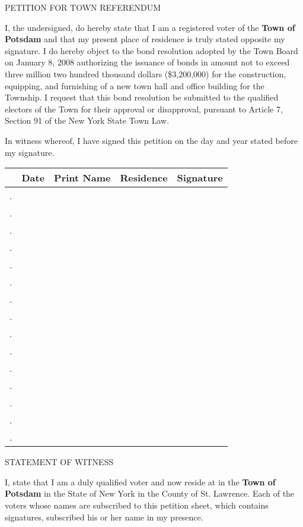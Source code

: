 \documentclass[12pt]{article}
\begin{document}
\begin{center}
PETITION FOR TOWN REFERENDUM
\end{center}

I, the undersigned, do hereby state that I am a  registered  voter  of
 the  {\bf Town  of Potsdam} and that  my present  place of residence is truly
  stated opposite my signature.  I do hereby object to the bond resolution adopted by the Town Board on January 8, 2008 authorizing the issuance of bonds in amount not to exceed three million two hundred thousand dollars (\$3,200,000) for the construction, equipping, and furnishing of a new town hall and office building for the Township.  I request that this bond resolution be submitted to the qualified electors of the Town for their approval or disapproval, pursuant to Article 7, Section 91 of the New York State Town Law.

In witness whereof, I have signed this petition on the  day  and  year
  stated before my signature.

\vspace{0.25in}

{\Large

\setcounter{sigNumber}{1}

\newcommand\sigLine{\thesigNumber. \addtocounter{sigNumber}{1} & & & &\\
\hline}

\begin{center}
\noindent\begin{tabular}{|r|p{}|p{}|p{}|p{}|}
\hline
&Date&Print Name&Residence&Signature\\
\hline
\hline
\sigLine
\sigLine
\sigLine
\sigLine
\sigLine
\sigLine
\sigLine
\sigLine
\sigLine
\sigLine
\sigLine
\sigLine
\sigLine
\sigLine
\sigLine
\end{tabular}
\end{center}

}

\vspace{0.25in}

\begin{center}
STATEMENT OF WITNESS
\end{center}

    I,  \underline{\hspace{4in}}  state  that I am a duly qualified voter and
  now reside at  \underline{\hspace{4in}} in the {\bf Town of  Potsdam}  in  the  State  of  New  York  in  the  County  of
  St. Lawrence.  Each of the voters whose  names  are  subscribed  to
  this   petition  sheet, which contains \underline{\hspace{1in}} signatures, subscribed his or her name in my presence.
    
\end{document}
